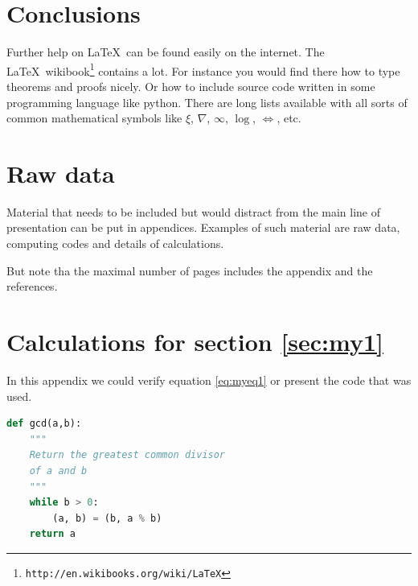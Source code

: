 \documentclass{uonmathreport}
\begin{document}
\section{Conclusions} \label{sec:conclusions}

Further help on \LaTeX\ can be found easily on the internet. The \LaTeX\
wikibook\footnote{\tt http://en.wikibooks.org/wiki/LaTeX} contains a lot.
For instance you would find there how to type theorems and proofs nicely.
Or how to include source code written in some programming language like
python. There are long lists available with all sorts of common
mathematical symbols like $\xi$, $\nabla$, $\infty$, $\log$, $\iff$, etc.

\newpage

\appendix

\section{Raw data} \label{app:rawdata}

Material that needs to be included but would distract from the main
line of presentation can be put in appendices.
Examples of such material are raw
data, computing codes and details of calculations.

But note tha the maximal number of pages includes the appendix and the references.

\section{Calculations for section \ref{sec:my1}} \label{app:calculations}

In this appendix we could verify equation \eqref{eq:myeq1} or present the code that was used. 
\begin{lstlisting}[language=Python]
def gcd(a,b):
    """
    Return the greatest common divisor
    of a and b 
    """
    while b > 0:
        (a, b) = (b, a % b)
    return a
\end{lstlisting}

\newpage

\printbibliography
\end{document}
